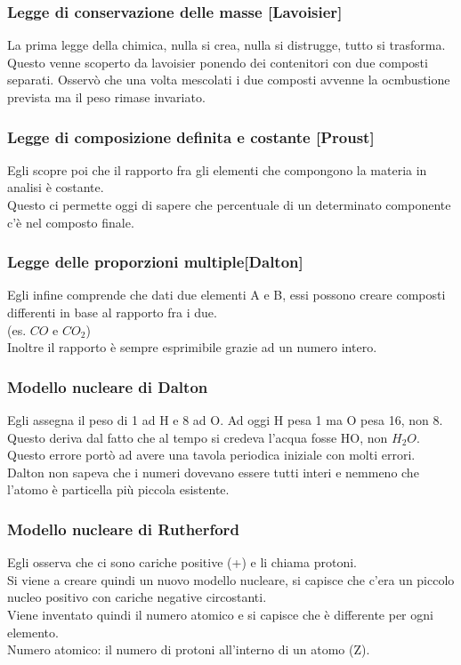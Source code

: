 \subsubsection{Legge di conservazione delle masse [Lavoisier]}
La prima legge della chimica, nulla si crea, nulla si distrugge, tutto si trasforma.\\
Questo venne scoperto da lavoisier ponendo dei contenitori con due composti separati. Osservò che una volta mescolati i due composti avvenne la ocmbustione prevista ma il peso rimase invariato.
\subsubsection{Legge di composizione definita e costante [Proust]}
Egli scopre poi che il rapporto fra gli elementi che compongono la materia in analisi è costante.\\
Questo ci permette oggi di sapere che percentuale di un determinato componente c'è nel composto finale.
\subsubsection{Legge delle proporzioni multiple[Dalton]}
Egli infine comprende che dati due elementi A e B, essi possono creare composti differenti in base al rapporto fra i due.\\
(es. $CO$ e $CO_2$)\\
Inoltre il rapporto è sempre esprimibile grazie ad un numero intero.
\subsubsection{Modello nucleare di Dalton}
Egli assegna il peso di 1 ad H e 8 ad O. Ad oggi H pesa 1 ma O pesa 16, non 8. Questo deriva dal fatto che al tempo si credeva l'acqua fosse HO, non $H_2O$.\\
Questo errore portò ad avere una tavola periodica iniziale con molti errori.\\
Dalton non sapeva che i numeri dovevano essere tutti interi e nemmeno che l'atomo è particella più piccola esistente.
\subsubsection{Modello nucleare di Rutherford}
Egli osserva che ci sono cariche positive (+) e li chiama protoni.\\
Si viene a creare quindi un nuovo modello nucleare, si capisce che c'era un piccolo nucleo positivo con cariche negative circostanti.\\
Viene inventato quindi il numero atomico e si capisce che è differente per ogni elemento.\\
Numero atomico: il numero di protoni all'interno di un atomo (Z).
